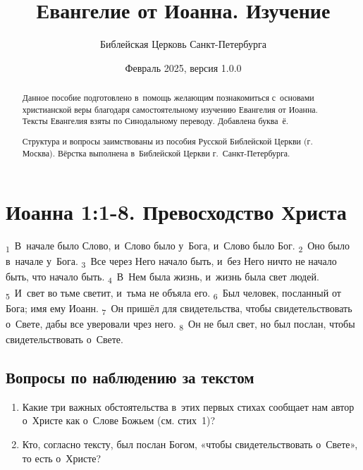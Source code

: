 \documentclass[a4paper,12pt]{article}
\title{Евангелие от Иоанна. Изучение}
\author{Библейская Церковь Санкт-Петербурга}
\date{\small{Февраль 2025, версия 1.0.0}}
\begin{document}
\maketitle

\thispagestyle{empty}

\begin{abstract}
    Данное пособие подготовлено в~помощь желающим познакомиться с~основами христианской веры благодаря самостоятельному изучению Евангелия от Иоанна. Тексты Евангелия взяты по Синодальному переводу. Добавлена буква~ё.
    
    Структура и вопросы заимствованы из пособия Русской Библейской Церкви (г. Москва). Вёрстка выполнена в~Библейской Церкви г.\ Санкт-Петербурга. 
\end{abstract}

\newpage

\tableofcontents


\newcommand{\myline}{\noindent\makebox[\linewidth]{\rule{\linewidth}{0.1pt}}}

\section{Иоанна 1:1-8. Превосходство Христа}

\textsubscript{1}~В~начале было Слово, и~Слово было у~Бога, и~Слово было Бог.
\textsubscript{2}~Оно было в~начале у~Бога.
\textsubscript{3}~Все через Него начало быть, и~без Него ничто не начало быть, что начало быть.
\textsubscript{4}~В~Нем была жизнь, и~жизнь была свет людей.
\textsubscript{5}~И~свет во тьме светит, и~тьма не объяла его.
\textsubscript{6}~Был человек, посланный от Бога; имя ему Иоанн.
\textsubscript{7}~Он пришёл для свидетельства, чтобы свидетельствовать о~Свете, дабы все уверовали чрез него.
\textsubscript{8}~Он не был свет, но был послан, чтобы свидетельствовать о~Свете.

\subsection*{Вопросы по наблюдению за текстом}
\begin{enumerate}
    \item Какие три важных обстоятельства в~этих первых стихах сообщает нам автор о~Христе как о~Слове Божьем (см. стих~1)? 
    
    \myline

    \myline

    \myline
    
    \item Кто, согласно тексту, был послан Богом, «чтобы свидетельствовать о~Свете», то есть о~Христе?
    
    \myline

\end{enumerate}
\end{document}
